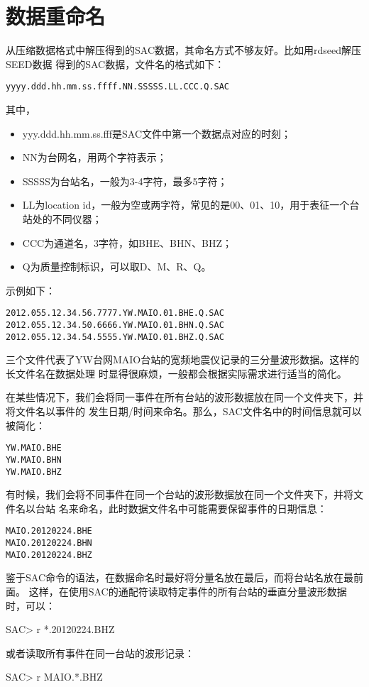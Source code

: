 \section{数据重命名}
从压缩数据格式中解压得到的SAC数据，其命名方式不够友好。比如用rdseed解压SEED数据
得到的SAC数据，文件名的格式如下：
\begin{verbatim}
yyyy.ddd.hh.mm.ss.ffff.NN.SSSSS.LL.CCC.Q.SAC
\end{verbatim}
其中，
\begin{itemize}
\item yyy.ddd.hh.mm.ss.fff是SAC文件中第一个数据点对应的时刻；
\item NN为台网名，用两个字符表示；
\item SSSSS为台站名，一般为3-4字符，最多5字符；
\item LL为location id，一般为空或两字符，常见的是00、01、10，用于表征一个台站处的不同仪器；
\item CCC为通道名，3字符，如BHE、BHN、BHZ；
\item Q为质量控制标识，可以取D、M、R、Q。
\end{itemize}

示例如下：
\begin{verbatim}
2012.055.12.34.56.7777.YW.MAIO.01.BHE.Q.SAC
2012.055.12.34.50.6666.YW.MAIO.01.BHN.Q.SAC
2012.055.12.34.54.5555.YW.MAIO.01.BHZ.Q.SAC
\end{verbatim}
三个文件代表了YW台网MAIO台站的宽频地震仪记录的三分量波形数据。这样的长文件名在数据处理
时显得很麻烦，一般都会根据实际需求进行适当的简化。

在某些情况下，我们会将同一事件在所有台站的波形数据放在同一个文件夹下，并将文件名以事件的
发生日期/时间来命名。那么，SAC文件名中的时间信息就可以被简化：
\begin{verbatim}
YW.MAIO.BHE
YW.MAIO.BHN
YW.MAIO.BHZ
\end{verbatim}

有时候，我们会将不同事件在同一个台站的波形数据放在同一个文件夹下，并将文件名以台站
名来命名，此时数据文件名中可能需要保留事件的日期信息：
\begin{verbatim}
MAIO.20120224.BHE
MAIO.20120224.BHN
MAIO.20120224.BHZ
\end{verbatim}

鉴于SAC命令的语法，在数据命名时最好将分量名放在最后，而将台站名放在最前面。
这样，在使用SAC的通配符读取特定事件的所有台站的垂直分量波形数据时，可以：
\begin{SACCode}
SAC> r *.20120224.BHZ
\end{SACCode}
或者读取所有事件在同一台站的波形记录：
\begin{SACCode}
SAC> r MAIO.*.BHZ
\end{SACCode}